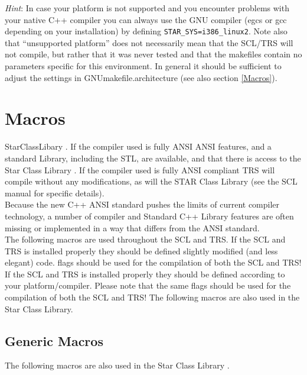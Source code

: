 \documentclass[twoside]{article}
\newcommand{\name}[1]{\textsf{#1}}%
\newcommand{\comp}[1]{\texttt{#1}}%
\begin{document}
{\textit{Hint}:  
In case your platform is not supported and you  
encounter problems with your native C++ compiler you can always use
the GNU  compiler (\name{egcs} or \name{gcc} depending on your
installation)   by 
defining \comp{STAR\_SYS=i386\_linux2}.  Note also
that ``unsupported platform'' does not necessarily mean that 
the SCL/TRS will not
compile, but rather that it was never tested and that the
makefiles contain no parameters specific for this environment.  In
general it should be sufficient to adjust the settings in
\name{GNUmakefile.architecture} (see also section \ref{Macros}).

\section{Macros}  \label{Macros}

StarClassLibary . If the compiler used is fully ANSI
ANSI features, and a standard Library, including the STL, are available,
and that there is access to the 
Star Class Library . If the compiler used is fully ANSI
compliant \name{TRS} will compile without any modifications, as will the 
STAR Class Library (see the SCL manual for specific details).\\
Because the new C++ ANSI standard pushes the limits of current  
compiler technology, a number of compiler and Standard C++ 
Library 
features are often missing or implemented in a way that differs from
the ANSI standard.\\
The following macros are used throughout the SCL and TRS.
If the SCL and TRS is installed properly they should be defined
slightly modified (and less elegant) code.
flags should be used for the compilation of both the SCL and TRS!
If the \name{SCL} and \name{TRS} is installed properly they should be defined
according to your platform/compiler.  Please note that the same
flags should be used for the compilation of both the \name{SCL} and \name{TRS}!
The following macros are also used in the  Star Class Library.
\subsection{Generic Macros}

The following macros are also used in the  Star Class Library .

}
\end{document}
